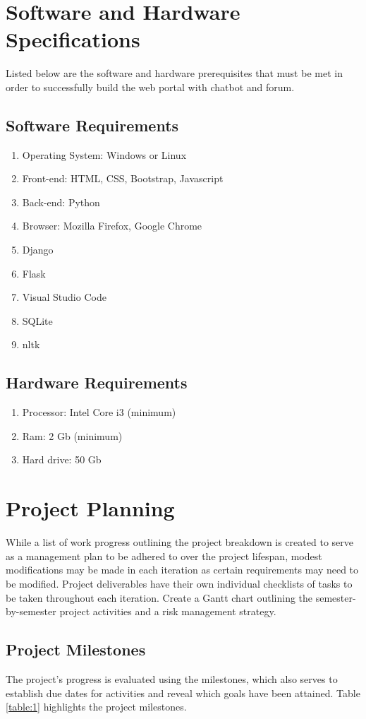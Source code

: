 \section{Software and Hardware Specifications}
Listed below are the software and hardware prerequisites that must be met in order to successfully build the web portal with chatbot and forum.
\subsection{Software Requirements}
\begin{enumerate}[label=$\bullet$]
	\item Operating System: Windows or Linux
	\item Front-end: HTML, CSS, Bootstrap, Javascript
	\item Back-end: Python
	\item Browser: Mozilla Firefox, Google Chrome
	\item Django
	\item Flask
	\item Visual Studio Code
	\item SQLite
	\item nltk
\end{enumerate}
\subsection{Hardware Requirements}
\begin{enumerate}[label=$\bullet$]
	\item Processor: Intel Core i3 (minimum) 
	\item Ram: 2 Gb (minimum)
	\item Hard drive: 50 Gb
\end{enumerate}

\section{Project Planning}

While a list of work progress outlining the project breakdown is created to serve as a management plan to be adhered to over the project lifespan, modest modifications may be made in each iteration as certain requirements may need to be modified. Project deliverables have their own individual checklists of tasks to be taken throughout each iteration. Create a Gantt chart outlining the semester-by-semester project activities and a risk management strategy.

\subsection{Project Milestones}
The project's progress is evaluated using the milestones, which also serves to establish due dates for activities and reveal which goals have been attained. Table \ref{table:1} highlights the project milestones.

